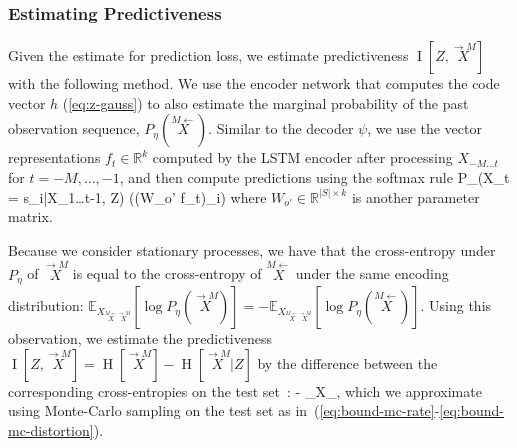 \documentclass[entropy,article,submit,moreauthors,pdftex,10pt,a4paper]{Definitions/mdpi}
\newif \ifcomment
\newcommand\mhahn[1]{\ifcomment{{\color{red}(#1)}}\else{}\fi}
\newcommand\rljf[1]{\ifcomment{{\color{blue}(#1)}}\else{}\fi}
\newcommand{\finitefuture}{\stackrel{\rightarrow \scriptscriptstyle{M}}{X}}
\newcommand{\finitepast}{\stackrel{\scriptscriptstyle{M}\leftarrow}{X}}%
\let\oldequation\equation
\let\oldendequation\endequation
\renewenvironment{equation}
  {\linenomathNonumbers\oldequation}
  {\oldendequation\endlinenomath}
\begin{document}
\subsubsection{Estimating Predictiveness}

Given the estimate for prediction loss, we estimate predictiveness $\operatorname{I}[Z, \finitefuture]$ with the following method.
We use the encoder network that computes the code vector $h$ (\ref{eq:z-gauss}) to also estimate the marginal probability of the past observation sequence, $P_\eta(\finitepast)$. 
Similar to the decoder $\psi$, we use the vector representations $f_t \in \mathbb{R}^k$ computed by the LSTM encoder after processing $X_{-M\dots t}$ for $t = -M, \dots, -1$, and then compute predictions using the softmax rule
\begin{equation}
	P_\eta(X_t = s_i|X_{1\dots t-1}, Z) \propto \exp((W_{o'} f_t)_i)
\end{equation}
where $W_{o'} \in \mathbb{R}^{|S|\times k}$ is another parameter matrix.

Because we consider stationary processes, we have 
that the cross-entropy under $P_\eta$ of $\finitefuture$ is equal to the cross-entropy of $\finitepast$ under the same encoding distribution: $\mathbb{E}_{X_{\finitepast\finitefuture}}\left[\log P_\eta(\finitefuture)\right] = - \mathbb{E}_{X_{\finitepast\finitefuture}}\left[\log P_\eta(\finitepast)\right]$. \rljf{I see that this is true if $P_\eta$ is the true marginal but what if it is approximate? Could $P_\eta$ end up non-stationary even when it comes from an encoder fit to a stationary distribution? Or is the stationarity of $P_\eta$ guaranteed because the encoder LSTM is autoregressive?} \mhahn{If $X_t$ is stationary, then the distributions of $\finitepast$ and $\finitefuture$ are the same, so these expectations are the same. Is there a way to make this more transparent?}
Using this observation, we estimate the predictiveness $\operatorname{I}[Z, \finitefuture] = \operatorname{H}[\finitefuture] - \operatorname{H}[\finitefuture|Z]$ by the difference between the corresponding cross-entropies on the test set~\cite{mcallester2018formal}:
\begin{equation}\label{eq:bound-mc-predictiveness}
- _{X_{\finitepast\finitefuture}}\left[\log P_\eta(\finitefuture) - \log P_\psi(\finitefuture | Z)\right],
\end{equation}
which we approximate using Monte-Carlo sampling on the test set as in~(\ref{eq:bound-mc-rate}-\ref{eq:bound-mc-distortion}).
\end{document}

